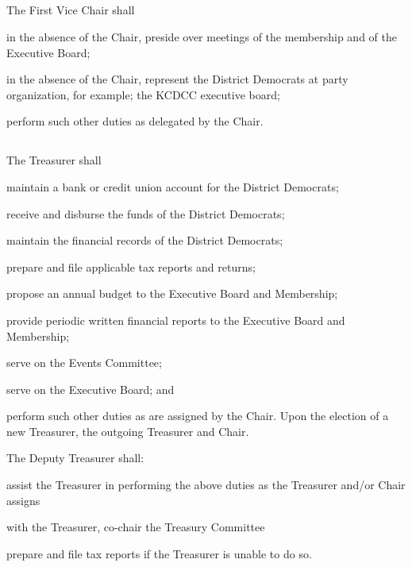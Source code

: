 \subsection{}
The First Vice Chair shall
\begin{inlinealphalist}
    \item in the absence of the Chair, preside over meetings of the membership and of the Executive Board;
    \item in the absence of the Chair, represent the \fortythird{} District Democrats at party organization, for example; the KCDCC executive board;
    \item perform such other duties as delegated by the Chair.
\end{inlinealphalist}

\subsection{}
The Treasurer shall
\begin{inlinealphalist}
    \item maintain a bank or credit union account for the \fortythird{} District Democrats;
    \item receive and disburse the funds of the \fortythird{} District Democrats;
    \item maintain the financial records of the \fortythird{} District Democrats;
    \item prepare and file applicable tax reports and returns;
    \item propose an annual budget to the Executive Board and Membership;
    \item provide periodic written financial reports to the Executive Board and Membership;
    \item serve on the Events Committee;
    \item serve on the Executive Board; and
    \item perform such other duties as are assigned by the Chair. Upon the election of a new Treasurer, the outgoing Treasurer and Chair.
\end{inlinealphalist}

The Deputy Treasurer shall:
\begin{inlinealphalist}
    \item assist the Treasurer in performing the above duties as the Treasurer and/or Chair assigns
    \item with the Treasurer, co-chair the Treasury Committee
    \item prepare and file tax reports if the Treasurer is unable to do so.
\end{inlinealphalist}

